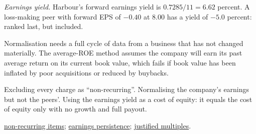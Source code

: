 \begin{qfmethod}
\emph{Earnings yield.} Harbour's forward earnings yield is $0.7285/11=6.62$ percent. A loss-making peer with forward EPS of $-0.40$ at 8.00 has a yield of $-5.0$ percent: ranked last, but included.

 Normalisation needs a full cycle of data from a business that has not changed materially. The average-ROE method assumes the company will earn its past average return on its current book value, which fails if book value has been inflated by poor acquisitions or reduced by buybacks.

 Excluding every charge as ``non-recurring''. Normalising the company's earnings but not the peers'. Using the earnings yield as a cost of equity: it equals the cost of equity only with no growth and full payout.

 \hyperref[meth:non-recurring-items]{non-recurring items}; \hyperref[meth:earnings-quality-persistence]{earnings persistence}; \hyperref[meth:justified-multiples]{justified multiples}.

\end{qfmethod}

